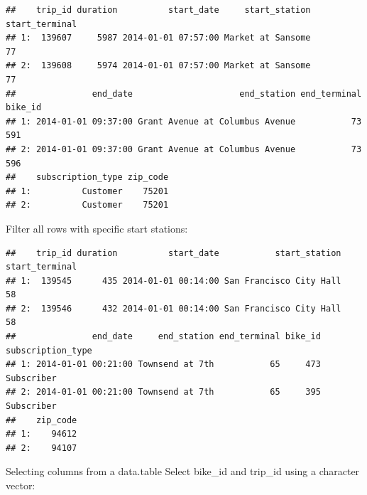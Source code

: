 \documentclass[]{book}
\newenvironment{Shaded}{\begin{snugshade}}{\end{snugshade}}
\newcommand{\DecValTok}[1]{\textcolor[rgb]{0.00,0.00,0.81}{#1}}
\newcommand{\KeywordTok}[1]{\textcolor[rgb]{0.13,0.29,0.53}{\textbf{#1}}}
\newcommand{\NormalTok}[1]{#1}
\newcommand{\OperatorTok}[1]{\textcolor[rgb]{0.81,0.36,0.00}{\textbf{#1}}}
\newcommand{\StringTok}[1]{\textcolor[rgb]{0.31,0.60,0.02}{#1}}
\begin{document}
\begin{verbatim}
##    trip_id duration          start_date     start_station start_terminal
## 1:  139607     5987 2014-01-01 07:57:00 Market at Sansome             77
## 2:  139608     5974 2014-01-01 07:57:00 Market at Sansome             77
##               end_date                     end_station end_terminal bike_id
## 1: 2014-01-01 09:37:00 Grant Avenue at Columbus Avenue           73     591
## 2: 2014-01-01 09:37:00 Grant Avenue at Columbus Avenue           73     596
##    subscription_type zip_code
## 1:          Customer    75201
## 2:          Customer    75201
\end{verbatim}

Filter all rows with specific start stations:

\begin{Shaded}
\end{Shaded}

\begin{verbatim}
##    trip_id duration          start_date           start_station start_terminal
## 1:  139545      435 2014-01-01 00:14:00 San Francisco City Hall             58
## 2:  139546      432 2014-01-01 00:14:00 San Francisco City Hall             58
##               end_date     end_station end_terminal bike_id subscription_type
## 1: 2014-01-01 00:21:00 Townsend at 7th           65     473        Subscriber
## 2: 2014-01-01 00:21:00 Townsend at 7th           65     395        Subscriber
##    zip_code
## 1:    94612
## 2:    94107
\end{verbatim}

Selecting columns from a data.table
Select bike\_id and trip\_id using a character vector:

\begin{Shaded}
\end{Shaded}
\end{document}
